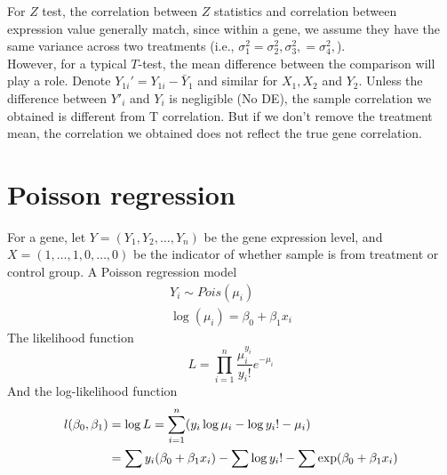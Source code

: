 \documentclass[12pt,oneside]{book}
\begin{document}
For $Z$ test, the correlation between $Z$ statistics and correlation between expression value generally match, since within a gene, we assume they have the same variance across two treatments (i.e., $\sigma_1^2=\sigma_2^2, \sigma_3^2,=\sigma_4^2,$). \\

However, for a typical $T$-test, the mean difference between the comparison will play a role. Denote 
$Y_{1i}'= Y_{1i}-\bar{Y}_1$ and similar for $X_1, X_2$ and $Y_2$.  Unless the difference between $Y'_i$ and $Y_i$ is negligible (No DE), the sample correlation we obtained is different from T correlation. But if we don’t remove the treatment mean, the correlation we obtained does not reflect the true gene correlation.


\newpage
\section*{Poisson regression}
For a gene, let $Y= (Y_1, Y_2, \ldots, Y_n)$ be the gene expression level, and $X= (1, \ldots, 1, 0, \ldots, 0)$ be the indicator of whether sample is from treatment or control group. A Poisson regression model 
\begin{align*}\label{poisson}
Y_i\sim Pois(\mu_i) \\
\log(\mu_i) = \beta_0 +\beta_1 x_i
\end{align*}
The likelihood function 
\[L = \prod_{i=1}^n \frac{\mu_i^{y_i}}{y_i!}e^{-\mu_i}\]
And the log-likelihood function
\begin{align}\label{poissonLikelihood}
l(\beta_0, \beta_1) & = \log L = \sum_{i=1}^n(y_i\log \mu_i - \log y_i! -\mu_i) \\ \notag
 & = \sum y_i(\beta_0 +\beta_1x_i) - \sum \log y_i! - \sum \exp(\beta_0 + \beta_1x_i) \notag
\end{align}
\end{document}
